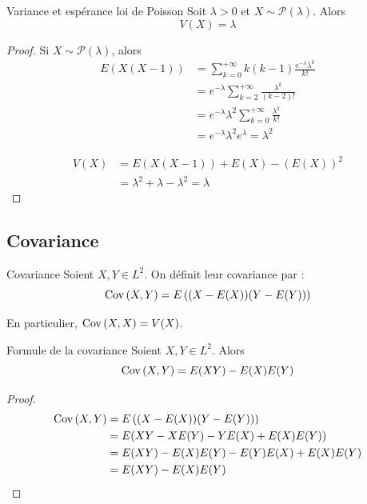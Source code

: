 \begin{proposition}{Variance et espérance loi de Poisson}{}
    Soit $\lambda > 0$ et $X \sim \mathcal P(\lambda)$. Alors 
    $$ V(X) = \lambda $$
\end{proposition}

\begin{proof}
    Si $X \sim \mathcal P(\lambda)$, alors 
    \begin{align}
        E(X(X - 1)) & = \sum_{k = 0}^{+ \infty} k (k - 1) \frac{e^{- \lambda} \lambda^k}{k!} \\
        & = e^{- \lambda} \sum_{k = 2}^{+ \infty} \frac{\lambda^k}{(k - 2)!} \\
        & = e^{- \lambda} \lambda^2 \sum_{k = 0}^{+ \infty} \frac{\lambda^k}{k!} \\
        & = e^{- \lambda} \lambda^2 e^{\lambda} = \lambda^2
    \end{align}

    \begin{align}
        V(X) & = E(X(X - 1)) + E(X) - (E(X))^2 \\
        & = \lambda^2 + \lambda - \lambda^2 = \lambda
    \end{align}
\end{proof}

\subsection{Covariance }

\begin{definition}{Covariance}{}
    Soient $X, Y \in L^2$. On définit leur covariance par : 
    $$ \operatorname{Cov} \,(X, Y) = E\left( (X - E(X))(Y - E(Y)) \right) $$

    En particulier, $\operatorname{Cov} \,(X, X) = V(X)$.
\end{definition}

\begin{proposition}{Formule de la covariance}{}
    Soient $X, Y \in L^2$. Alors 
    $$ \operatorname{Cov} \,(X, Y) = E(XY) - E(X) E(Y) $$
\end{proposition}

\begin{proof}
    \begin{align}
        \operatorname{Cov} \,(X, Y) & = E\left( (X - E(X))(Y - E(Y)) \right) \\
        & = E(XY - X E(Y) - Y E(X) + E(X) E(Y)) \\
        & = E(XY) - E(X) E(Y) - E(Y) E(X) + E(X) E(Y) \\
        & = E(XY) - E(X) E(Y)
    \end{align}
\end{proof}

